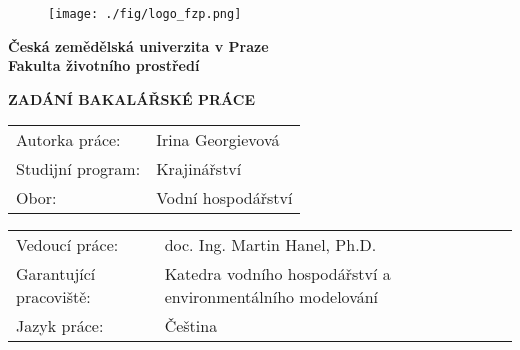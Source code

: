 \documentclass[usenames,dvipsnames,oneside,10.9pt]{article}
\begin{document}
\thispagestyle{empty}
\vspace*{-2.9cm}
\hspace*{-3cm}
\begin{minipage}[c]{0.25\textwidth}
\begin{figure}[H]
\centering
\texttt{[image: ./fig/logo\_fzp.png]}
\end{figure}
\end{minipage}
\hspace*{9mm}
\begin{minipage}[c]{0.75\textwidth}
\bfseries{Česká zemědělská univerzita v Praze} \\

\bfseries{Fakulta životního prostředí}
\end{minipage}

\vspace*{0.15cm}

\centerline{\large \textbf{ZADÁNÍ BAKALÁŘSKÉ PRÁCE}}

\vspace*{0.6cm}

\hspace*{-3cm}
\begin{tabular}{ll}

\noalign{\vspace{2mm}}
Autorka práce: \hspace*{2.3cm} & Irina Georgievová \\
\noalign{\vspace{2.3mm}}
Studijní program: \hspace*{2.3cm} & Krajinářství \\
\noalign{\vspace{2mm}}
Obor: \hspace*{2.3cm} & Vodní hospodářství \\
\end{tabular}

\vspace*{2mm}

\hspace*{-3cm}
\begin{tabular}{ll}

\noalign{\vspace{2mm}}
Vedoucí práce: \hspace*{1.55cm} & doc. Ing. Martin Hanel, Ph.D. \\
\noalign{\vspace{2mm}}
Garantující pracoviště: \hspace*{1.55cm} & Katedra vodního hospodářství a environmentálního modelování \\
\noalign{\vspace{2mm}}
Jazyk práce: \hspace*{1.55cm} & Čeština \\
\end{tabular}
\end{document}
